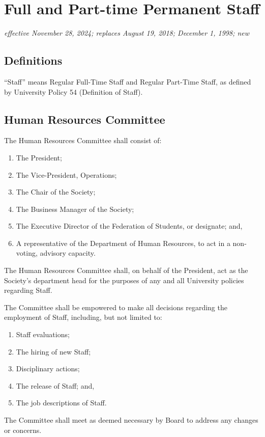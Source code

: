 \section{Full and Part-time Permanent Staff}
\emph{effective November 28, 2024; replaces August 19, 2018; December 1, 1998; new}\\

\subsection{Definitions}
``Staff'' means Regular Full-Time Staff and Regular Part-Time Staff, as defined
by University Policy 54 (Definition of Staff).

\subsection{Human Resources Committee}
The Human Resources Committee shall consist of:
\begin{enumerate}
    \item The President;
    \item The Vice-President, Operations;
    \item The Chair of the Society;
    \item The Business Manager of the Society;
    \item The Executive Director of the Federation of 
        Students, or designate; and,
    \item A representative of the Department of Human Resources, to act in a
        non-voting, advisory capacity.
\end{enumerate}

The Human Resources Committee shall, on behalf of the President, act as the
Society's department head for the purposes of any and all University policies
regarding Staff.

The Committee shall be empowered to make all decisions regarding the employment
of Staff, including, but not limited to:
\begin{enumerate}
    \item Staff evaluations;
    \item The hiring of new Staff;
    \item Disciplinary actions;
    \item The release of Staff; and,
    \item The job descriptions of Staff.
\end{enumerate}

The Committee shall meet as deemed necessary by Board to address any changes or concerns.

